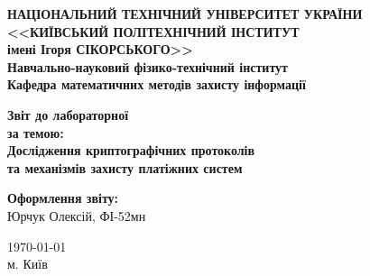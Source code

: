 \thispagestyle{empty}
\linespread{1.1}

\begin{center}
    {\bfseries\large
        НАЦІОНАЛЬНИЙ ТЕХНІЧНИЙ УНІВЕРСИТЕТ УКРАЇНИ \\
        <<КИЇВСЬКИЙ ПОЛІТЕХНІЧНИЙ ІНСТИТУТ \\
        імені Ігоря СІКОРСЬКОГО>> \\
        Навчально-науковий фізико-технічний інститут \\
        \medskip
        Кафедра математичних методів захисту інформації}
\end{center}

\begin{center}
\vspace{40mm}
{\bfseries\huge Звіт до лабораторної } \\
{\bfseries\Large за темою:} \\
{\bfseries\Large Дослідження криптографічних протоколів} \\
{\bfseries\Large та механізмів захисту платіжних систем} \\
\end{center}

\vspace{55mm}
\begin{center}
    \hfill
    \begin{minipage}[t]{0.4\textwidth}
        \begin{flushright}
            \textbf{Оформлення звіту:} \\
                Юрчук Олексій, ФІ-52мн \\
        \end{flushright}
    \end{minipage}
\end{center}

\vfill
\begin{center}
    \today \\
    {м. Київ}
\end{center}

\newpage
{}
